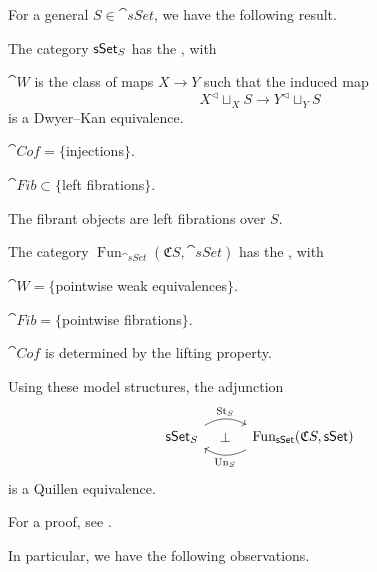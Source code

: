 For a general $S\in\cat{sSet}$, we have the following result.

\begin{theorem}\label{thm-5-g}
    The category $\mathsf{sSet}_{\/S}$ has the , with
    \begin{itms}
        \item $\cat{W}$ is the class of maps $X\to Y$ such that the induced map 
        \[ X^\vartriangleleft\mathop{\sqcup}_XS\to Y^\vartriangleleft\mathop{\sqcup}_YS \]
        is a Dwyer--Kan equivalence.
        \item $\cat{Cof}=\{$injections$\}$.
        \item $\cat{Fib}\subset\{$left fibrations$\}$.
        \item The fibrant objects are left fibrations over $S$.
    \end{itms}
    The category $\operatorname{Fun}_{\cat{sSet}}(\mathfrak CS,\cat{sSet})$
    has the , with
    \begin{itms}
        \item $\cat W=\{$pointwise weak equivalences$\}$.
        \item $\cat{Fib}=\{$pointwise fibrations$\}$.
        \item $\cat{Cof}$ is determined by the lifting property.
    \end{itms}
    Using these model structures, the adjunction
    \[\begin{tikzcd}[column sep=3em]
        \cat{sSet}_{\/S}\ar[r,bend left,start anchor=north east,end anchor=north west,"\operatorname{St}_S"]
        \ar[r,phantom,"\bot"] &
        \operatorname{Fun}_{\cat{sSet}}(\mathfrak CS,\cat{sSet})
        \ar[l,bend left,start anchor=south west,end anchor=south east,"\operatorname{Un}_S"]
    \end{tikzcd}\]
    is a Quillen equivalence.
\end{theorem}

For a proof, see \cite[Theorem~2.2.1.2]{htt}.

In particular, we have the following observations.

